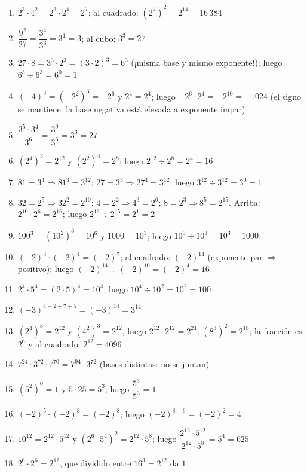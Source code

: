 \documentclass[12pt, letterpaper]{article}
\begin{document}
\begin{enumerate}[leftmargin=*, label=\textbf{\arabic*.}]
  \item $2^3 \cdot 4^2 = 2^3 \cdot 2^4 = 2^7$; al cuadrado: $\left(2^7\right)^2 = 2^{14} = 16\,384$
  \item $\dfrac{9^2}{27} = \dfrac{3^4}{3^3} = 3^1 = 3$; al cubo: $3^3 = 27$
  \item $27 \cdot 8 = 3^3 \cdot 2^3 = (3 \cdot 2)^3 = 6^3$ (¡misma base y mismo exponente!); luego $6^3 \div 6^3 = 6^0 = 1$
  \item $(-4)^3 = \left(-2^2\right)^3 = -2^6$ y $2^4 = 2^4$; luego $-2^6 \cdot 2^4 = -2^{10} = -1024$ (el signo se mantiene: la base negativa está elevada a exponente impar)
  \item $\dfrac{3^5 \cdot 3^4}{3^6} = \dfrac{3^9}{3^6} = 3^3 = 27$
  \item $(2^4)^3 = 2^{12}$ y $(2^2)^4 = 2^8$; luego $2^{12} \div 2^8 = 2^4 = 16$
  \item $81 = 3^4 \Rightarrow 81^3 = 3^{12}$; $27 = 3^3 \Rightarrow 27^4 = 3^{12}$; luego $3^{12} \div 3^{12} = 3^0 = 1$
  \item $32 = 2^5 \Rightarrow 32^2 = 2^{10}$; $4 = 2^2 \Rightarrow 4^3 = 2^6$; $8 = 2^3 \Rightarrow 8^5 = 2^{15}$. Arriba: $2^{10} \cdot 2^6 = 2^{16}$; luego $2^{16} \div 2^{15} = 2^1 = 2$
  \item $100^3 = (10^2)^3 = 10^6$ y $1000 = 10^3$; luego $10^6 \div 10^3 = 10^3 = 1000$
  \item $(-2)^3 \cdot (-2)^4 = (-2)^7$; al cuadrado: $(-2)^{14}$ (exponente par $\Rightarrow$ positivo); luego $(-2)^{14} \div (-2)^{10} = (-2)^4 = 16$
  \item $2^4 \cdot 5^4 = (2 \cdot 5)^4 = 10^4$; luego $10^4 \div 10^2 = 10^2 = 100$
  \item $(-3)^{4-2+7+5} = (-3)^{14} = 3^{14}$
  \item $(2^4)^3 = 2^{12}$ y $(4^2)^3 = 2^{12}$, luego $2^{12} \cdot 2^{12} = 2^{24}$; $(8^3)^2 = 2^{18}$; la fracción es $2^6$ y al cuadrado: $2^{12} = 4096$
  \item $7^{24} \cdot 3^{72} \cdot 7^{70} = 7^{94} \cdot 3^{72}$ (bases distintas: no se juntan)
  \item $(5^2)^0 = 1$ y $5 \cdot 25 = 5^3$; luego $\dfrac{5^3}{5^3} = 1$
  \item $(-2)^5 \cdot (-2)^3 = (-2)^8$; luego $(-2)^{8-6} = (-2)^2 = 4$
  \item $10^{12} = 2^{12} \cdot 5^{12}$ y $\left(2^6 \cdot 5^4\right)^2 = 2^{12} \cdot 5^{8}$; luego $\dfrac{2^{12} \cdot 5^{12}}{2^{12} \cdot 5^{8}} = 5^4 = 625$
  \item $2^6 \cdot 2^6 = 2^{12}$, que dividido entre $16^3 = 2^{12}$ da $1$

\end{enumerate}
\end{document}
